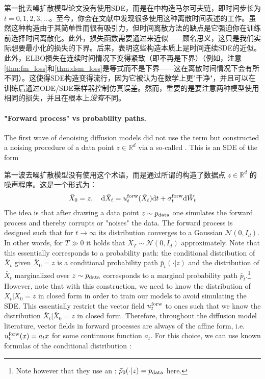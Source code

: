 第一批去噪扩散模型论文\citep{sohl2015deep, song2019generative, ho2020denoising}没有使用SDE，而是在中构造马尔可夫链，即时间步长为 $t=0,1,2,3,\dots$。至今，你会在文献中发现很多使用这种离散时间表述的工作。虽然这种构造由于其简单性而很有吸引力，但时间离散方法的缺点是它强迫你在训练前选择时间离散化。此外，损失函数需要通过来近似——顾名思义，这只是我们实际想要最小化的损失的下界。后来，\citet{song2020score}表明这些构造本质上是时间连续SDE的近似。此外，ELBO损失在连续时间情况下变得紧致（即不再是下界）（例如，注意\cref{thm:fm_loss}和\cref{thm:dsm_loss}是等式而不是下界——这在离散时间情况下会有所不同）。这使得SDE构造变得流行，因为它被认为在数学上更"干净"，并且可以在训练后通过ODE/SDE采样器控制仿真误差。然而，重要的是要注意两种模型使用相同的损失，并且在根本上\textit{没有}不同。

\paragraph{"Forward process" vs probability paths.} The first wave of denoising diffusion models \citep{sohl2015deep, song2019generative, ho2020denoising, song2020score} did not use the term  but constructed a noising procedure of a data point $z\in\mathbb{R}^d$ via a so-called . This is an SDE of the form

第一波去噪扩散模型\citep{sohl2015deep, song2019generative, ho2020denoising, song2020score}没有使用这个术语，而是通过所谓的构造了数据点 $z\in\mathbb{R}^d$ 的噪声程序。这是一个形式为：
\begin{align}
\label{eq:forward_process}
    \bar{X}_0=z,\quad \mathrm{d} \bar{X}_t = u^{\text{forw}}_t(\bar{X}_t)\mathrm{d} t + \sigma^{\text{forw}}_t \mathrm{d} \bar{W}_t
\end{align}
The idea is that after drawing a data point $z\sim p_{\rm{data}}$ one simulates the forward process and thereby corrupts or "noises" the data. The forward process is designed such that for $t\to \infty$ its distribution converges to a Gaussian $\mathcal{N}(0,I_d)$. In other words, for $T\gg 0$ it holds that $\bar{X}_{T}\sim\mathcal{N}(0,I_d)$ approximately. Note that this essentially corresponds to a probability path: the conditional distribution of $\bar{X}_t$ given $\bar{X}_0=z$ is a conditional probability path $\bar{p}_t(\cdot|z)$ and the distribution of $\bar{X}_t$ marginalized over $z\sim p_{\rm{data}}$ corresponds to a marginal probability path $\bar{p}_t$.\footnote{Note however that they use an : $\bar{p}_0(\cdot|z)=p_{\rm{data}}$ here.} However, note that with this construction, we need to know the distribution of $X_t|X_0=z$ in closed form in order to train our models to avoid simulating the SDE. This essentially restrict the vector field $u^{\text{forw}}_t$ to ones such that we know the distribution $\bar{X}_t|\bar{X}_0=z$ in closed form. Therefore, throughout the diffusion model literature, vector fields in forward processes are always of the affine form, i.e. $u^{\text{forw}}_t(x)=a_t x$ for some continuous function $a_t$. For this choice, we can use known formulas of the conditional distribution \citep{sarkka2019applied,song2021sde, karras2022elucidating}:

